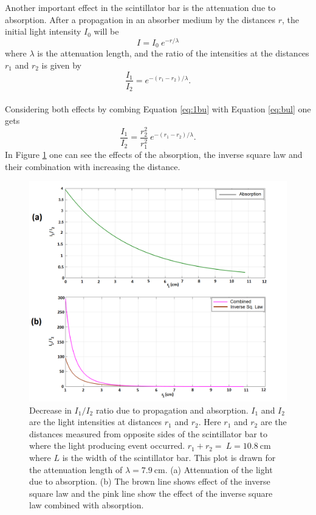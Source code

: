\documentclass[a4paper]{article}\linespread{1.4}
\begin{document}
Another important effect in the scintillator bar is the attenuation due to absorption. After a propagation in an absorber medium by the distances $r$, the initial light intensity $I_{0}$ will be 
\begin{equation}I = I_{0} \ e^{-r/\lambda} \end{equation} 
where $\lambda$ is the attenuation length,
and the ratio of the intensities at the distances $r_{1}$ and $r_{2}$ is given by
\begin{equation} \frac{I_{1}}{I_{2}} = e^{-(r_{1}-r_{2})/\lambda} .\label{eq:bul}\end{equation}
\\Considering both effects by combing Equation \ref{eq:1bu} with Equation \ref{eq:bul}
one gets
\begin{equation} \frac{I_{1}}{I_{2}} =   \frac{r_{2}^{2}}{r_{1}^{2}} \ e^{-(r_{1}-r_{2})/\lambda} .\label{eq:4}\end{equation}
In Figure \ref{fig:gull} one can see the effects of the absorption, the inverse square law and their combination with increasing the distance. 
\begin{figure}[h!] 
	\hspace*{0cm} 
	\includegraphics[width=120mm,scale=2.0]{1t.png} 
	\caption{%
	Decrease in $I_{1} / I_{2}$ ratio due to propagation and absorption. $I_{1}$ and  $I_{2}$ are the light intensities at distances  $r_{1}$ and  $r_{2}$. Here $r_{1}$ and $r_{2}$ are the distances measured from opposite sides of the scintillator bar to where the light producing event occurred. $r_{1}+ r_{2}= \ L = 10.8~\mathrm{cm}$ where $L$ is the width of the scintillator bar. This plot is drawn for the attenuation length of $\lambda=7.9~\mathrm{cm}$.  (a) Attenuation of the light due to absorption. (b) The brown line shows effect of the inverse square law and the pink line show the effect of the inverse square law combined with absorption. %
	}
	\label{fig:gull}
\end{figure}
\end{document}
